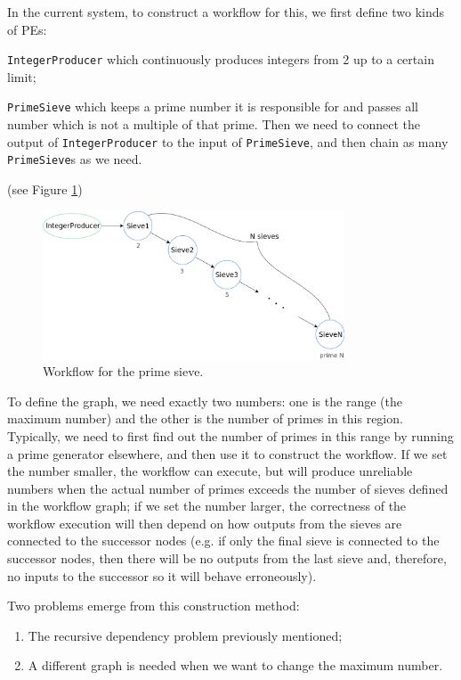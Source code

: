 \newcommand{\cdIntGen}{\lstinline|IntegerProducer|\xspace}
\newcommand{\cdSieve}{\lstinline|PrimeSieve|\xspace}

In the current \dpy system, to construct a workflow for this, we first define two kinds of PEs:
\begin{enumerate*}
	\item \cdIntGen which continuously produces integers from 2 up to a certain limit;
	\item \cdSieve which keeps a prime number it is responsible for and passes all number which is not a multiple of that prime. Then we need to connect the output of \cdIntGen to the input of \cdSieve , and then chain as many \cdSieve{}s as we need.
\end{enumerate*} (see Figure \ref{fig:sieve_static})

\begin{figure}[h]\centering
    \includegraphics[width=0.8\textwidth]{figures/sieve_static}
	\caption{Workflow for the prime sieve.}
\label{fig:sieve_static}
\end{figure}

To define the graph, we need exactly two numbers: one is the range (\ie the maximum number) and the other is the number of primes in this region. Typically, we need to first find out the number of primes in this range by running a prime generator elsewhere, and then use it to construct the workflow. If we set the number smaller, the workflow can execute, but will produce unreliable numbers when the actual number of primes exceeds the number of sieves defined in the workflow graph; if we set the number larger, the correctness of the workflow execution will then depend on how outputs from the sieves are connected to the successor nodes (e.g. if only the final sieve is connected to the successor nodes, then there will be no outputs from the last sieve and, therefore, no inputs to the successor so it will behave erroneously).

Two problems emerge from this construction method:
\begin{enumerate}
	\item The recursive dependency problem previously mentioned;
	\item A different graph is needed when we want to change the maximum number.
\end{enumerate}


